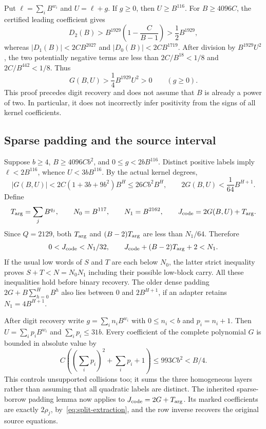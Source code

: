 Put $\ell=\sum_iB^{w_i}$ and $U=\ell+g$.  If $g\ge0$, then
$U\ge B^{116}$.  For $B\ge4096C$, the certified leading coefficient gives
\[
 D_2(B)>B^{1929}\left(1-\frac{C}{B-1}\right)
       >\frac12B^{1929},
\]
whereas $|D_1(B)|<2CB^{2027}$ and $|D_0(B)|<2CB^{1719}$.
After division by $B^{1929}U^2$, the two potentially negative terms are
less than $2C/B^{18}<1/8$ and $2C/B^{442}<1/8$.  Thus
\begin{equation}\label{eq:split-positive}
 G(B,U)>\frac14B^{1929}U^2>0
 \qquad(g\ge0).
\end{equation}
This proof precedes digit recovery and does not assume that $B$ is already
a power of two.  In particular, it does not incorrectly infer positivity
from the signs of all kernel coefficients.

\subsection{Sparse padding and the source interval}
Suppose $b\ge4$, $B\ge4096Cb^2$, and $0\le g<2bB^{116}$.
Distinct positive labels imply $\ell<2B^{116}$, whence
$U<3bB^{116}$.  By the actual kernel degrees,
\[
 |G(B,U)|<2C(1+3b+9b^2)B^H\le26Cb^2B^H,
 \qquad 2G(B,U)<\frac1{64}B^{H+1}.
\]
Define
\[
 T_{\rm arg}=\sum_jB^{q_j},\qquad N_0=B^{117},\qquad N_1=B^{2162},
 \qquad J_{\rm code}=2G(B,U)+T_{\rm arg}.
\]
Since $Q=2129$, both $T_{\rm arg}$ and $(B-2)T_{\rm arg}$ are less than
$N_1/64$.  Therefore
\[
 0<J_{\rm code}<N_1/32,\qquad
 J_{\rm code}+(B-2)T_{\rm arg}+2<N_1.
\]
If the usual low words of $S$ and $T$ are each below $N_0$, the latter
strict inequality proves $S+T<N=N_0N_1$ including their possible low-block
carry.  All these inequalities hold before binary recovery.  The older dense
padding $2G+B\sum_{h=0}^HB^h$ also lies between $0$ and $2B^{H+1}$, if an
adapter retains $N_1=4B^{H+1}$.

After digit recovery write $g=\sum_i n_iB^{w_i}$ with $0\le n_i<b$ and
$p_i=n_i+1$.  Then $U=\sum_i p_iB^{w_i}$ and $\sum_i p_i\le31b$.
Every coefficient of the complete polynomial $G$ is bounded in absolute
value by
\begin{equation}\label{eq:split-digit-bound}
 C\left((\sum_i p_i)^2+\sum_i p_i+1\right)
 \le993Cb^2<B/4.
\end{equation}
This controls unsupported collisions too; it sums the three homogeneous
layers rather than assuming that all quadratic labels are distinct.
The inherited sparse-borrow padding lemma now applies to
$J_{\rm code}=2G+T_{\rm arg}$.  Its marked coefficients are exactly
$2\rho_j$, by~\eqref{eq:split-extraction}, and the row inverse recovers the
original source equations.

